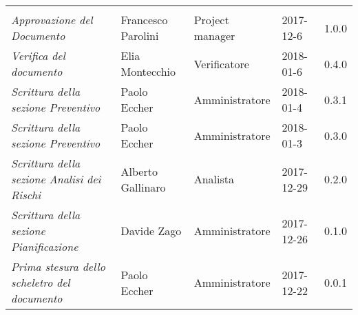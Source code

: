 \newpage 
\section*{}
\begin{table}[H]
	\centering
	\begin{tabular}{p{4cm}|C{3cm}|C{3cm}|R{2.5cm}|R{2cm}}
		
		 & & & & \\
		
		
		\emph{Approvazione del Documento} & Francesco Parolini & Project manager & 2017-12-6 & 1.0.0\\
		\hline
		
		\emph{Verifica del documento} & Elia Montecchio & Verificatore & 2018-01-6 & 0.4.0 \\
		\hline
		
		\emph{Scrittura della sezione Preventivo} & Paolo Eccher & Amministratore & 2018-01-4 & 0.3.1 \\
		\hline
		
		\emph{Scrittura della sezione Preventivo} & Paolo Eccher & Amministratore & 2018-01-3 & 0.3.0 \\
		\hline
		
		\emph{Scrittura della sezione Analisi dei Rischi}& Alberto Gallinaro & Analista & 2017-12-29 & 0.2.0 \\
		\hline
		
		\emph{Scrittura della sezione Pianificazione}& Davide Zago & Amministratore & 2017-12-26 & 0.1.0 \\
		\hline
		
		\emph{Prima stesura dello scheletro del documento} & Paolo Eccher & Amministratore & 2017-12-22 & 0.0.1 \\
		
	\end{tabular}
	
\end{table}


\clearpage
